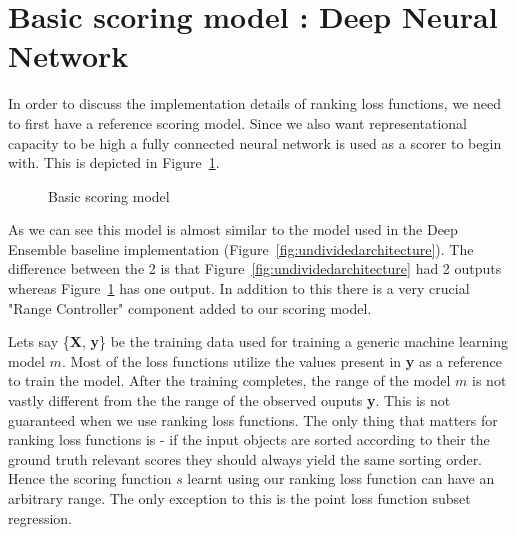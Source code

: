 \documentclass[12pt, twoside, ngerman]{report}
\begin{document}
\section{Basic scoring model : Deep Neural Network}
\label{sec:BasicScoringModelDNN}
In order to discuss the implementation details of ranking loss functions,  we need to first have a reference scoring model.
Since we also want representational capacity to be high a fully connected neural network is used as a scorer to begin with.
This is depicted in Figure~\ref{fig:basicScoringModel}.
\begin{figure}[htb]
\centering
{}
\caption{Basic scoring model}
\label{fig:basicScoringModel}
\end{figure}

As we can see this model is almost similar to the model used in the Deep Ensemble baseline implementation (Figure~\ref{fig:undividedarchitecture}).
The difference between the 2 is that Figure~\ref{fig:undividedarchitecture} had 2 outputs whereas Figure~\ref{fig:basicScoringModel} has one output.
In addition to this there is a very crucial "Range Controller" component added to our scoring model.

Lets say \{\textbf{X}, \textbf{y}\} be the training data used for training a generic machine learning model $m$.
Most of the loss functions utilize the values present in \textbf{y} as a reference to train the model.
After the training completes,  the range of the model $m$ is not vastly different from the the range of the observed ouputs \textbf{y}.
This is not guaranteed when we use ranking loss functions.
The only thing that matters for ranking loss functions is - if the input objects are sorted according to their the ground truth relevant scores they should always yield the same sorting order.
Hence the scoring function $s$ learnt using our ranking loss function can have an arbitrary range.
The only exception to this is the point loss function subset regression.
\end{document}
